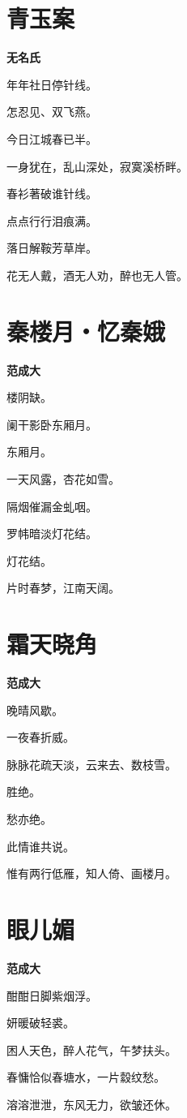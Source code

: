 \documentclass[12pt,a4paper]{ctexbook}
\begin{document}
\section{青玉案}
\textbf{无名氏}\par\vspace{0.5em}
年年社日停针线。\par
怎忍见、双飞燕。\par
今日江城春已半。\par
一身犹在，乱山深处，寂寞溪桥畔。\par
春衫著破谁针线。\par
点点行行泪痕满。\par
落日解鞍芳草岸。\par
花无人戴，酒无人劝，醉也无人管。\par

\section{秦楼月・忆秦娥}
\textbf{范成大}\par\vspace{0.5em}
楼阴缺。\par
阑干影卧东厢月。\par
东厢月。\par
一天风露，杏花如雪。\par
隔烟催漏金虬咽。\par
罗帏暗淡灯花结。\par
灯花结。\par
片时春梦，江南天阔。\par

\section{霜天晓角}
\textbf{范成大}\par\vspace{0.5em}
晚晴风歇。\par
一夜春折威。\par
脉脉花疏天淡，云来去、数枝雪。\par
胜绝。\par
愁亦绝。\par
此情谁共说。\par
惟有两行低雁，知人倚、画楼月。\par

\section{眼儿媚}
\textbf{范成大}\par\vspace{0.5em}
酣酣日脚紫烟浮。\par
妍暖破轻裘。\par
困人天色，醉人花气，午梦扶头。\par
春慵恰似春塘水，一片縠纹愁。\par
溶溶泄泄，东风无力，欲皱还休。\par
\end{document}
